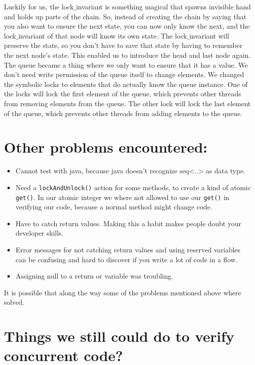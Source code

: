 Luckily for us, the lock$\_$invariant is something magical that spawns invisible hand and holds up parts of the chain. So, instead of creating the chain by saying that you also want to ensure the next state, you can now only know the next, and the lock$\_$invariant of that node will know its own state. The lock$\_$invariant will preserve the state, so you don't have to save that state by having to remember the next node's state. This enabled us to introduce the head and last node again. The queue became a thing where we only want to ensure that it has a value. We don't need write permission of the queue itself to change elements. We changed the symbolic locks to elements that do actually know the queue instance. One of the locks will lock the first element of the queue, which prevents other threads from removing elements from the queue. The other lock will lock the last element of the queue, which prevents other threads from adding elements to the queue.

\section{Other problems encountered:}
\begin{itemize}
	\item Cannot test with java, because java doesn't recognize seq<..> as data type.
	\item Need a {\tt lockAndUnlock()} action for some methods, to create a kind of atomic {\tt get()}. In our atomic integer we where not allowed to use our {\tt get()} in verifying our code, because a normal method might change code.
	\item Have to catch return values. Making this a habit makes people doubt your developer skills.
	\item Error messages for not catching return values and using reserved variables can be confusing and hard to discover if you write a lot of code in a flow.
	\item Assigning null to a return or variable was troubling.
\end{itemize}

It is possible that along the way some of the problems mentioned above where solved.

\section{Things we still could do to verify concurrent code?}

